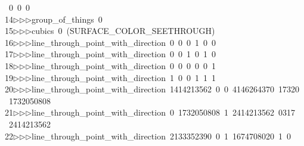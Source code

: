 \begin{tabbing}
\>\ 0\ 0\ 0\ \\[0pt]
14\>$\triangleright$\>$\triangleright$\>$\triangleright$\>group\_of\_things\ 0\ \\[0pt]
15\>$\triangleright$\>$\triangleright$\>$\triangleright$\>cubics\ 0\ (SURFACE\_COLOR\_SEETHROUGH)\ \\[0pt]
16\>$\triangleright$\>$\triangleright$\>$\triangleright$\>line\_through\_point\_with\_direction\ 0\ 0\ 0\ 1\ 0\ 0\ \\[0pt]
17\>$\triangleright$\>$\triangleright$\>$\triangleright$\>line\_through\_point\_with\_direction\ 0\ 0\ 1\ 0\ 1\ 0\ \\[0pt]
18\>$\triangleright$\>$\triangleright$\>$\triangleright$\>line\_through\_point\_with\_direction\ 0\ 0\ 0\ 0\ 0\ 1\ \\[0pt]
19\>$\triangleright$\>$\triangleright$\>$\triangleright$\>line\_through\_point\_with\_direction\ 1\ 0\ 0\ 1\ 1\ 1\ \\[0pt]
20\>$\triangleright$\>$\triangleright$\>$\triangleright$\>line\_through\_point\_with\_direction\ 1414213562\ 0\ 0\ 4146264370\ 17320\\[0pt]
\ 1732050808\ \\[0pt]
21\>$\triangleright$\>$\triangleright$\>$\triangleright$\>line\_through\_point\_with\_direction\ 0\ 1732050808\ 1\ 2414213562\ 0317\\[0pt]
\ 2414213562\ \\[0pt]
22\>$\triangleright$\>$\triangleright$\>$\triangleright$\>line\_through\_point\_with\_direction\ 2133352390\ 0\ 1\ 1674708020\ 1\ 0\\[0pt]

\end{tabbing}
